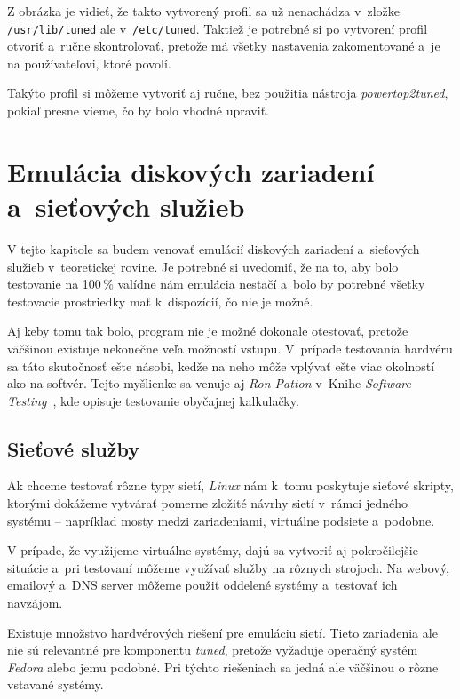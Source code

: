 Z obrázka je vidieť, že takto vytvorený profil sa už nenachádza v~zložke
\texttt{/usr/lib/tuned} ale v~\texttt{/etc/tuned}. Taktiež je potrebné si po
vytvorení profil otvoriť a~ručne skontrolovať, pretože má všetky nastavenia
zakomentované a~je na používateľovi, ktoré povolí. 

Takýto profil si môžeme vytvoriť aj ručne, bez použitia nástroja
\emph{powertop2tuned}, pokiaľ presne vieme, čo by bolo vhodné upraviť. 

%
%

\chapter{Emulácia diskových zariadení a~sieťových služieb}

V tejto kapitole sa budem venovať emulácií diskových zariadení a~sieťových
služieb v~teoretickej rovine. Je potrebné si uvedomiť, že na to, aby bolo
testovanie na 100\,\% valídne nám emulácia nestačí a~bolo by potrebné všetky
testovacie prostriedky mať k~dispozícií, čo nie je možné.

Aj keby tomu tak bolo, program nie je možné dokonale otestovať, pretože
väčšinou existuje nekonečne veľa možností vstupu. V~prípade testovania hardvéru
sa táto skutočnosť ešte násobi, kedže na neho môže vplývať ešte viac okolností
ako na softvér. Tejto myšlienke sa venuje aj \emph{Ron Patton} v~Knihe
\emph{Software Testing}~\cite{Software_testing_patton}, kde opisuje testovanie
obyčajnej kalkulačky.

\section{Sieťové služby}

Ak chceme testovať rôzne typy sietí, \emph{Linux} nám k~tomu poskytuje sieťové
skripty, ktorými dokážeme vytvárať pomerne zložité návrhy sietí v~rámci jedného
systému -- napríklad mosty medzi zariadeniami, virtuálne podsiete a~podobne.

V prípade, že využijeme virtuálne systémy, dajú sa vytvoriť aj pokročilejšie
situácie a~pri testovaní môžeme využívať služby na rôznych strojoch. Na webový,
emailový a~DNS server môžeme použiť oddelené systémy a~testovať ich navzájom.

Existuje množstvo hardvérových riešení pre emuláciu sietí. Tieto zariadenia ale
nie sú relevantné pre komponentu \emph{tuned}, pretože vyžaduje operačný systém
\emph{Fedora} alebo jemu podobné. Pri týchto riešeniach sa jedná ale väčšinou o
rôzne vstavané systémy.

